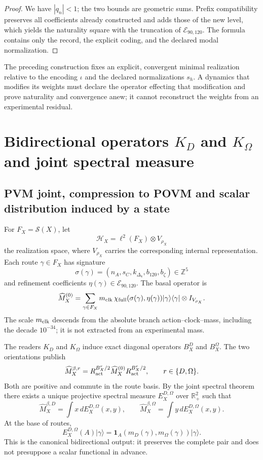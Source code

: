 \begin{proof}
We have \(|q_n|<1\); the two bounds are geometric sums. Prefix
compatibility preserves all coefficients already constructed and adds those of the
new level, which yields the naturality square with the truncation of
\(\mathcal E_{90,120}\). The formula contains only the record, the explicit
coding, and the declared modal normalization.
\end{proof}

The preceding construction fixes an explicit, convergent minimal realization relative to the encoding \(\iota\) and the declared normalizations \(s_h\). A dynamics that modifies its weights must declare the operator effecting that modification and prove naturality and convergence anew; it cannot reconstruct the weights from an experimental residual.

\section{Bidirectional operators \texorpdfstring{\(K_D\) and \(K_\Omega\)}{K_D and K_Omega} and joint spectral measure}

\subsection{PVM joint, compression to POVM and scalar distribution induced by a state}

For \(F_X=\mathscr S(X)\), let
\[
 \mathcal H_X=\ell^2(F_X)\otimes V_{\rho_X}
\]
the realization space, where \(V_{\rho_X}\) carries the corresponding internal
representation. Each route \(\gamma\in F_X\) has signature
\[
 \sigma(\gamma)
 =(n_A,s_C,k_{\Delta_4},b_{120},b_\zeta)\in\mathbb Z^5
\]
and refinement coefficients
\(\eta(\gamma)\in\mathcal E_{90,120}\). The basal operator is
\[
 \widehat M_X^{(0)}
 =\sum_{\gamma\in F_X}
 m_{\rm clk}\,
 \chi_{\rm full}(\sigma(\gamma),\eta(\gamma))
 |\gamma\rangle\langle\gamma|\otimes I_{V_{\rho_X}}.
\]
The scale \(m_{\rm clk}\) descends from the absolute branch
action--clock--mass, including the decade \(10^{-34}\); it is not extracted from an
experimental mass.

The readers \(K_D\) and \(K_\Omega\) induce exact diagonal operators
\(B_X^D\) and \(B_X^\Omega\). The two orientations publish
\[
 \widehat M_X^{\beta,r}
 =R_{\rm act}^{B_X^r/2}\widehat M_X^{(0)}
  R_{\rm act}^{B_X^r/2},
 \qquad r\in\{D,\Omega\}.
\]
Both are positive and commute in the route basis. By the joint spectral theorem
there exists a unique projective spectral measure
\(E_X^{D,\Omega}\) over \(\mathbb R_+^2\) such that
\[
 \widehat M_X^{\beta,D}
 =\int x\,dE_X^{D,\Omega}(x,y),
 \qquad
 \widehat M_X^{\beta,\Omega}
 =\int y\,dE_X^{D,\Omega}(x,y).
\]
At the base of routes,
\[
 E_X^{D,\Omega}(A)|\gamma\rangle
 =\mathbf 1_A\!\left(m_D(\gamma),m_\Omega(\gamma)\right)
  |\gamma\rangle.
\]
This is the canonical bidirectional output: it preserves the complete pair and does not
presuppose a scalar functional in advance.

